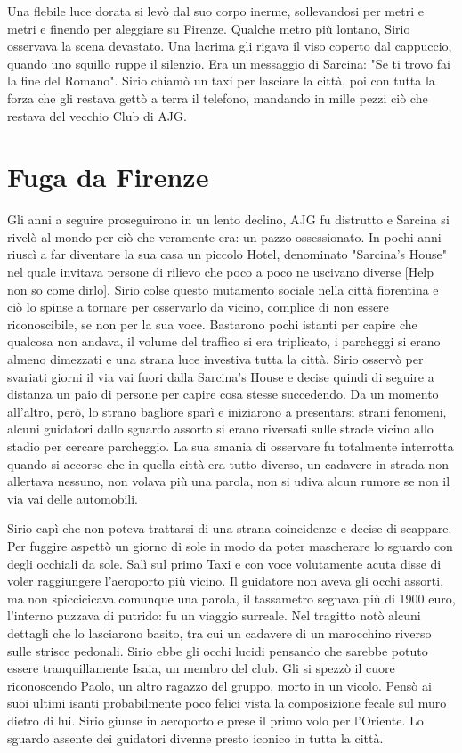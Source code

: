 Una flebile luce dorata si levò dal suo corpo inerme, sollevandosi per metri e metri e finendo per aleggiare su Firenze.
Qualche metro più lontano, Sirio osservava la scena devastato.
Una lacrima gli rigava il viso coperto dal cappuccio, quando uno squillo ruppe il silenzio.
Era un messaggio di Sarcina: "Se ti trovo fai la fine del Romano".
Sirio chiamò un taxi per lasciare la città, poi con tutta la forza che gli restava gettò a terra il telefono, mandando in mille pezzi ciò che restava del vecchio Club di AJG.

\section{Fuga da Firenze}
Gli anni a seguire proseguirono in un lento declino, AJG fu distrutto e Sarcina si rivelò al mondo per ciò che veramente era: un pazzo ossessionato. In pochi anni riuscì a far diventare la sua casa un piccolo Hotel, denominato "Sarcina's House" nel quale invitava persone di rilievo che poco a poco ne uscivano diverse [Help non so come dirlo]. Sirio colse questo mutamento sociale nella città fiorentina e ciò lo spinse a tornare per osservarlo da vicino, complice di non essere riconoscibile, se non per la sua voce. Bastarono pochi istanti per capire che qualcosa non andava, il volume del traffico si era triplicato, i parcheggi si erano almeno dimezzati e una strana luce investiva tutta la città. Sirio osservò per svariati giorni il via vai fuori dalla Sarcina's House e decise quindi di seguire a distanza un paio di persone per capire cosa stesse succedendo. Da un momento all'altro, però, lo strano bagliore sparì e iniziarono a presentarsi strani fenomeni, alcuni guidatori dallo sguardo assorto si erano riversati sulle strade vicino allo stadio per cercare parcheggio. La sua smania di osservare fu totalmente interrotta quando si accorse che in quella città era tutto diverso, un cadavere in strada non allertava nessuno, non volava più una parola, non si udiva alcun rumore se non il via vai delle automobili.

Sirio capì che non poteva trattarsi di una strana coincidenze e decise di scappare. Per fuggire aspettò un giorno di sole in modo da poter mascherare lo sguardo con degli occhiali da sole. Salì sul primo Taxi e con voce volutamente acuta disse di voler raggiungere l'aeroporto più vicino. Il guidatore non aveva gli occhi assorti, ma non spiccicicava comunque una parola, il tassametro segnava più di 1900 euro, l'interno puzzava di putrido: fu un viaggio surreale. 
Nel tragitto notò alcuni dettagli che lo lasciarono basito, tra cui un cadavere di un marocchino riverso sulle strisce pedonali. Sirio ebbe gli occhi lucidi pensando che sarebbe potuto essere tranquillamente Isaia, un membro del club. Gli si spezzò il cuore riconoscendo Paolo, un altro ragazzo del gruppo, morto in un vicolo. Pensò ai suoi ultimi isanti probabilmente poco felici vista la composizione fecale sul muro dietro di lui.
Sirio giunse in aeroporto e prese il primo volo per l'Oriente. Lo sguardo assente dei guidatori divenne presto iconico in tutta la città.
